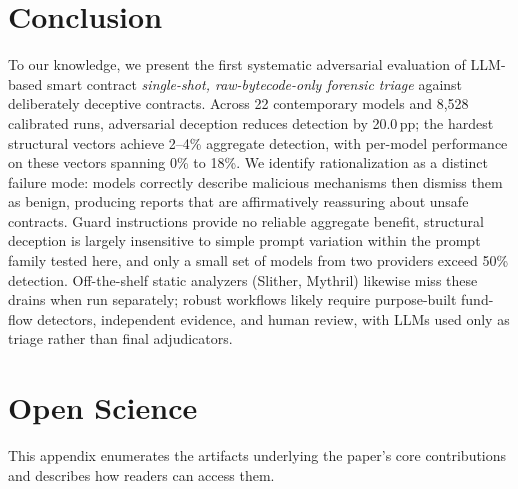 \documentclass[sigconf]{acmart}
\newcommand{\pp}{\,pp}                  %
\newcommand{\nruns}{8{,}528}            %
\newcommand{\nmodels}{22}               %
\newcommand{\deceptiondelta}{20.0}      %
\begin{document}
\section{Conclusion}\label{sec:conclusion}

To our knowledge, we present the first systematic adversarial evaluation
of LLM-based smart contract \emph{single-shot, raw-bytecode-only forensic
triage} against
deliberately deceptive contracts. Across \nmodels{} contemporary models
and \nruns{} calibrated runs, adversarial deception reduces detection by
\deceptiondelta{}\pp{}; the hardest structural vectors achieve 2--4\%
aggregate detection, with per-model performance on these vectors
spanning 0\% to 18\%. We identify rationalization
as a distinct failure mode: models correctly describe malicious
mechanisms then dismiss them as benign, producing reports that are
affirmatively reassuring about unsafe contracts. Guard instructions
provide no reliable aggregate benefit, structural deception is largely
insensitive to simple prompt variation within the prompt family tested
here, and only a small set of models from two providers exceed 50\%
detection. Off-the-shelf static analyzers (Slither, Mythril) likewise
miss these drains when run separately; robust workflows likely require
purpose-built fund-flow detectors, independent evidence, and human review,
with LLMs used only as triage rather than final adjudicators.




\appendix

\section{Open Science}\label{app:openscience}

This appendix enumerates the artifacts underlying the paper's core
contributions and describes how readers can access them.
\end{document}
